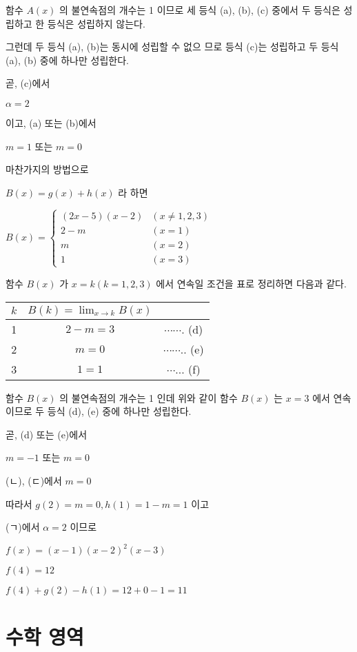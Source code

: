 \documentclass[10pt]{article}
\begin{document}
함수 \(A(x)\) 의 불연속점의 개수는 1 이므로 세 등식 (a), (b), (c) 중에서 두 등식은 성립하고 한 등식은 성립하지 않는다.

그런데 두 등식 (a), (b)는 동시에 성립할 수 없으 므로 등식 (c)는 성립하고 두 등식 (a), (b) 중에 하나만 성립한다.

곧, (c)에서

\(\alpha=2\)

이고, (a) 또는 (b)에서

\(m=1\) 또는 \(m=0\)

마찬가지의 방법으로

\(B(x)=g(x)+h(x)\) 라 하면

\(B(x)= \begin{cases}(2 x-5)(x-2) & (x \neq 1,2,3) \\ 2-m & (x=1) \\ m & (x=2) \\ 1 & (x=3)\end{cases}\)

함수 \(B(x)\) 가 \(x=k(k=1,2,3)\) 에서 연속일 조건을 표로 정리하면 다음과 같다.

\begin{center}
\begin{tabular}{|c|c|c|}
\hline
\(k\) & \(B(k)=\lim _{x \rightarrow k} B(x)\) &  \\
\hline
1 & \(2-m=3\) & \(\cdots \cdots\). (d) \\
\hline
2 & \(m=0\) & \(\cdots \cdots .\). (e) \\
\hline
3 & \(1=1\) & \(\cdots . .\). (f) \\
\hline
\end{tabular}
\end{center}

함수 \(B(x)\) 의 불연속점의 개수는 1 인데 위와 같이 함수 \(B(x)\) 는 \(x=3\) 에서 연속이므로 두 등식 (d), (e) 중에 하나만 성립한다.

곧, (d) 또는 (e)에서

\(m=-1\) 또는 \(m=0\)

(ㄴ), (ㄷ)에서 \(m=0\)

따라서 \(g(2)=m=0, h(1)=1-m=1\) 이고

(ㄱ)에서 \(\alpha=2\) 이므로

\(f(x)=(x-1)(x-2)^{2}(x-3)\)

\(f(4)=12\)

\(f(4)+g(2)-h(1)=12+0-1=11\)

\section*{수학 영역}
\end{document}
